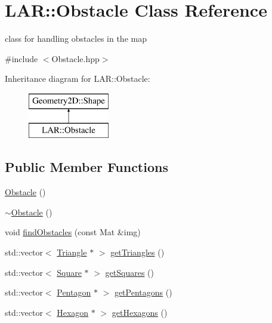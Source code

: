 \hypertarget{class_l_a_r_1_1_obstacle}{}\section{L\+AR\+:\+:Obstacle Class Reference}
\label{class_l_a_r_1_1_obstacle}


class for handling obstacles in the map  




{\ttfamily \#include $<$Obstacle.\+hpp$>$}

Inheritance diagram for L\+AR\+:\+:Obstacle\+:\begin{figure}[H]
\begin{center}
\leavevmode
\includegraphics[height=2.000000cm]{class_l_a_r_1_1_obstacle}
\end{center}
\end{figure}
\subsection*{Public Member Functions}
\begin{DoxyCompactItemize}
\item 
\mbox{\hyperlink{class_l_a_r_1_1_obstacle_a50654be1a82945b51a2078aec80ffed3}{Obstacle}} ()
\item 
\mbox{\hyperlink{class_l_a_r_1_1_obstacle_aa0717ccb71e9331a56581282b934453c}{$\sim$\+Obstacle}} ()
\item 
void \mbox{\hyperlink{class_l_a_r_1_1_obstacle_aa3fd1dea2442cf16e78a7c95a6e55150}{find\+Obstacles}} (const Mat \&img)
\item 
std\+::vector$<$ \mbox{\hyperlink{class_geometry2_d_1_1_triangle}{Triangle}} $\ast$ $>$ \mbox{\hyperlink{class_l_a_r_1_1_obstacle_a3cf38a39212e094c8712e3abfd3fd355}{get\+Triangles}} ()
\item 
std\+::vector$<$ \mbox{\hyperlink{class_geometry2_d_1_1_square}{Square}} $\ast$ $>$ \mbox{\hyperlink{class_l_a_r_1_1_obstacle_a2fa87a62ae0c59e84b18363eb3d94505}{get\+Squares}} ()
\item 
std\+::vector$<$ \mbox{\hyperlink{class_geometry2_d_1_1_pentagon}{Pentagon}} $\ast$ $>$ \mbox{\hyperlink{class_l_a_r_1_1_obstacle_af05966394f29bfa13777369db076d60a}{get\+Pentagons}} ()
\item 
std\+::vector$<$ \mbox{\hyperlink{class_geometry2_d_1_1_hexagon}{Hexagon}} $\ast$ $>$ \mbox{\hyperlink{class_l_a_r_1_1_obstacle_af099a0d58043207698ab8953b7bb6885}{get\+Hexagons}} ()
\end{DoxyCompactItemize}



